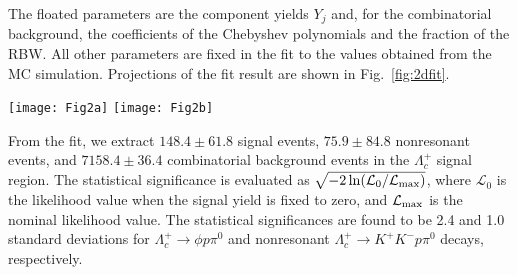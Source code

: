 \documentclass[aps,prl,twocolumn,superscriptaddress,showpacs,preprintnumbers,amsmath,amssymb]{revtex4-1}
\begin{document}
The floated parameters are the component yields $Y_j$ and, for the combinatorial background, the coefficients of the Chebyshev polynomials and the fraction of the RBW. All other parameters are fixed in the fit to the  values obtained from the MC simulation.
Projections of the fit result are shown in Fig.~\ref{fig:2dfit}.
\begin{figure*}[h!tp]
\begin{center}
    \texttt{[image: Fig2a]}%
       \texttt{[image: Fig2b]}
\end{center}
\vskip -0.5cm
\caption{\small Projections of the 2D fit: (a) $m(K^+K^- p\pi^0)$ and (b) $m(K^+K^-)$. The points with the error bars are the  data, and the (red) dotted, (green) dashed and (brown) dot-dashed curves represent the combinatorial,  signal and nonresonant candidates, respectively, and (blue) solid curves represent the total PDF. The solid curve in (b) completely overlaps the curve for the combinatorial background.}
\label{fig:2dfit}
\end{figure*}
From the fit, we extract $148.4\pm61.8$ signal events, $75.9\pm84.8$ nonresonant events, 
and $7158.4\pm36.4$ combinatorial background events in the $\Lambda_c^+$ signal region.  The statistical significance is evaluated as $\sqrt{-2\ln(\mathcal{L}_0/\mathcal{L}_{\rm max})}$, where $\mathcal{L}_0$ is the likelihood value when the signal yield is fixed to zero, and $\mathcal{L}_{\rm max}$ is  the nominal likelihood value. The statistical significances are found to be 2.4 and 1.0 standard deviations for $\Lambda_c^+\to\phi p \pi^0$ and nonresonant $\Lambda_c^+\to K^+K^- p \pi^0$ decays, respectively.
\end{document}
